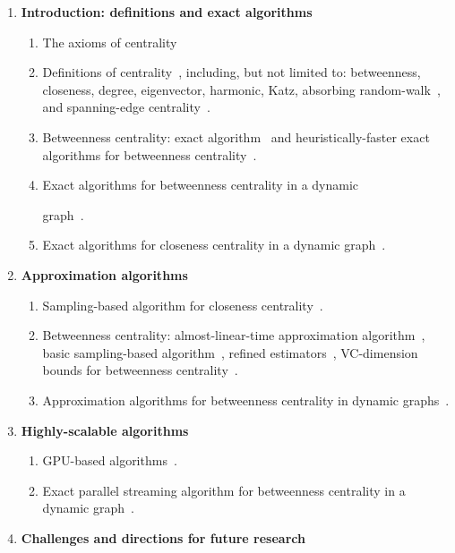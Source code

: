 \documentclass[pdfpagelabels=false]{sig-alternate-2013} %
\begin{document}
\begin{enumerate}
	\item {\bf Introduction: definitions and exact algorithms}
		\begin{enumerate}
			\item The axioms of centrality~\citep{BoldiV14}
			\item Definitions of centrality~\citep{Newman10}, including, but not
				limited to: betweenness, closeness, degree, eigenvector,
				harmonic, Katz, absorbing random-walk~\citep{MavroforakisMG15},
				and spanning-edge centrality~\citep{MavroforakisGLKT15}.
			\item Betweenness centrality: exact algorithm~\citep{Brandes01} and
				heuristically-faster exact algorithms for betweenness
				centrality~\citep{ErdosIBT15,SariyuceSKC13}.
			\item Exact algorithms for betweenness centrality in a dynamic

				graph~\citep{LeeLPCC12,NasrePR14,PontecorviR15}.
			\item Exact algorithms for closeness centrality in a dynamic
				graph~\citep{SariyuceKSC13b}.
		\end{enumerate}
	\item {\bf Approximation algorithms}
		\begin{enumerate}
			\item Sampling-based algorithm for closeness
				centrality~\citep{EppsteinW04}.
			\item Betweenness centrality: almost-linear-time approximation
				algorithm~\citep{Yoshida14}, basic sampling-based
				algorithm~\citep{BrandesP07}, refined
				estimators~\citep{GeisbergerSS08}, VC-dimension bounds for
				betweenness centrality~\citep{RiondatoK15}.
			\item Approximation algorithms for betweenness centrality in dynamic
				graphs~\citep{KasWCC13,BergaminiMS14,BergaminiM15,HayashiAY15}.
		\end{enumerate}
	\item {\bf Highly-scalable algorithms}
		\begin{enumerate}
			\item GPU-based algorithms~\citep{SariyuceKSC13}.
			\item Exact parallel streaming algorithm for betweenness centrality in a
				dynamic graph~\citep{KourtellisMB15}.
		\end{enumerate}
	\item {\bf Challenges and directions for future research}
\end{enumerate}
\end{document}
